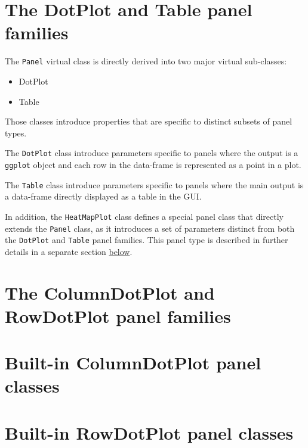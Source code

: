 \documentclass[]{book}
\providecommand{\tightlist}{%
  \setlength{\itemsep}{0pt}\setlength{\parskip}{0pt}}
\begin{document}
\hypertarget{the-dotplot-and-table-panel-families}{%
\section{The DotPlot and Table panel families}\label{the-dotplot-and-table-panel-families}}

The \texttt{Panel} virtual class is directly derived into two major virtual sub-classes:

\begin{itemize}
\tightlist
\item
  DotPlot
\item
  Table
\end{itemize}

Those classes introduce properties that are specific to distinct subsets of panel types.

The \texttt{DotPlot} class introduce parameters specific to panels where the output is a \texttt{ggplot} object and each row in the data-frame is represented as a point in a plot.

The \texttt{Table} class introduce parameters specific to panels where the main output is a data-frame directly displayed as a table in the GUI.

In addition, the \texttt{HeatMapPlot} class defines a special panel class that directly extends the \texttt{Panel} class, as it introduces a set of parameters distinct from both the \texttt{DotPlot} and \texttt{Table} panel families.
This panel type is described in further details in a separate section \protect\hyperlink{heatmapplot-class}{below}.

\hypertarget{the-columndotplot-and-rowdotplot-panel-families}{%
\section{The ColumnDotPlot and RowDotPlot panel families}\label{the-columndotplot-and-rowdotplot-panel-families}}

\hypertarget{built-in-columndotplot-panel-classes}{%
\section{Built-in ColumnDotPlot panel classes}\label{built-in-columndotplot-panel-classes}}

\hypertarget{built-in-rowdotplot-panel-classes}{%
\section{Built-in RowDotPlot panel classes}\label{built-in-rowdotplot-panel-classes}}
\end{document}
